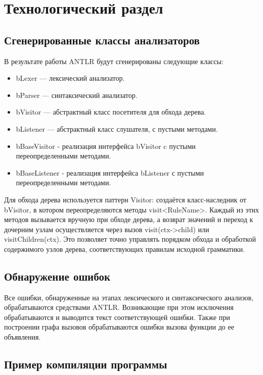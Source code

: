 
\chapter{Технологический раздел}

\section{Сгенерированные классы анализаторов}

В результате работы ANTLR будут сгенерированы следующие классы:
\begin{itemize}
	\item bLexer — лексический анализатор.
	\item bParser — синтаксический анализатор.
	\item bVisitor — абстрактный класс посетителя для обхода дерева.
	\item bListener — абстрактный класс слушателя, с пустыми методами.
    \item bBaseVisitor - реализация интерфейса bVisitor c пустыми переопределенными методами.
    \item bBaseListener - реализация интерфейса bListener с пустыми переопределенными методами.
\end{itemize}

Для обхода дерева используется паттерн Visitor: создаётся класс-наследник от bVisitor, в котором переопределяются методы visit<RuleName>. 
Каждый из этих методов вызывается вручную при обходе дерева, а возврат значений и переход к дочерним узлам осуществляется через вызов visit(ctx->child) или visitChildren(ctx). 
Это позволяет точно управлять порядком обхода и обработкой содержимого узлов дерева, соответствующих правилам исходной грамматики.

\section{Обнаружение ошибок}

Все ошибки, обнаруженные на этапах лексического и синтаксического анализов, обрабатываются средствами ANTLR.
Возникающие при этом исключения обрабатываются и выводится текст соответствующей ошибки.
Также при построении графа вызовов обрабатываются ошибки вызова функции до ее объявления.

\section{Пример компиляции программы}

